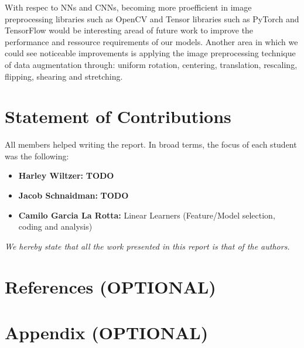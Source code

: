 \documentclass[10pt, hidelinks]{article}
\begin{document}
\noindent With respec to NNs and CNNs, becoming more proefficient in image preprocessing libraries such as OpenCV and Tensor libraries such as PyTorch and TensorFlow would be interesting aread of future work to improve the performance and ressource requirements of our models. Another area in which we could see noticeable improvements is applying the image preprocessing technique of data augmentation through: uniform rotation, centering, translation, rescaling, flipping, shearing and stretching. 


\section*{Statement of Contributions}

All members helped writing the report. In broad terms, the focus of each student was the following:

\begin{itemize}
    \item \textbf{Harley Wiltzer:} \textbf{TODO}
    \item \textbf{Jacob Schnaidman:} \textbf{TODO}
    \item \textbf{Camilo Garcia La Rotta:} Linear Learners (Feature/Model selection, coding and analysis)
\end{itemize}

\textit{We hereby state that all the work presented in this report is that of the authors.}

\section*{References (OPTIONAL)}

\section*{Appendix (OPTIONAL)}
\end{document}
